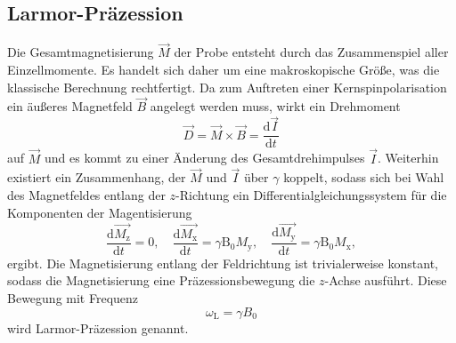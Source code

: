 \subsection{Larmor-Präzession}
Die Gesamtmagnetisierung $\vec{M}$ der Probe entsteht durch das Zusammenspiel aller
Einzellmomente. Es handelt sich daher um eine makroskopische Größe, was die klassische
Berechnung rechtfertigt.
Da zum Auftreten einer Kernspinpolarisation ein äußeres Magnetfeld $\vec{B}$ angelegt werden muss,
wirkt ein Drehmoment
\begin{equation}
		\vec{D} = \vec{M} \times \vec{B} = \frac{\text{d} \vec{I}}{\text{d}t}
\end{equation}
auf $\vec{M}$ und es kommt zu einer Änderung des Gesamtdrehimpulses $\vec{I}$.
Weiterhin existiert ein Zusammenhang, der $\vec{M}$ und $\vec{I}$ über $\gamma$
koppelt, sodass sich bei Wahl des Magnetfeldes entlang der $z$-Richtung ein Differentialgleichungssystem
für die Komponenten der Magentisierung
\begin{equation}
		\frac{\text{d} \vec{M_\text{z}}}{\text{d}t} = 0 ,  \hspace{1em}
		\frac{\text{d} \vec{M_\text{x}}}{\text{d}t} = \gamma \text{B}_0
		M_\text{y}, \hspace{1em}
		\frac{\text{d} \vec{M_\text{y}}}{\text{d}t} = \gamma \text{B}_0
		M_\text{x},
\end{equation}
ergibt.
Die Magnetisierung entlang der Feldrichtung ist trivialerweise konstant, sodass
die Magnetisierung eine Präzessionsbewegung die $z$-Achse
ausführt.
Diese Bewegung mit Frequenz
\begin{equation}
  \omega_{\text{L}} = \gamma B_{0}
\end{equation}
wird Larmor-Präzession genannt.

